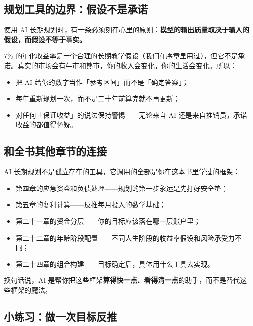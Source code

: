 \documentclass[a4paper,11pt,oneside,fontset=none,UTF8,zihao=-4]{ctexbook}
\providecommand{\tightlist}{\setlength{\itemsep}{2pt}\setlength{\parskip}{1pt}}
\begin{document}
\subsection{规划工具的边界：假设不是承诺}\label{ux89c4ux5212ux5de5ux5177ux7684ux8fb9ux754cux5047ux8bbeux4e0dux662fux627fux8bfa}

使用 AI
长期规划时，有一条必须刻在心里的原则：\textbf{模型的输出质量取决于输入的假设，而假设不等于事实。}

7\%
的年化收益率是一个合理的长期教学假设（我们在序章里用过），但它不是承诺。真实的市场会有牛市和熊市，你的收入会变化，你的生活会变化。所以：

\begin{itemize}
\tightlist
\item
  把 AI 给你的数字当作「参考区间」而不是「确定答案」；
\item
  每年重新规划一次，而不是二十年前算完就不再更新；
\item
  对任何「保证收益」的说法保持警惕------无论来自 AI
  还是来自推销员，承诺收益的都值得怀疑。
\end{itemize}

\subsection{和全书其他章节的连接}\label{ux548cux5168ux4e66ux5176ux4ed6ux7ae0ux8282ux7684ux8fdeux63a5}

AI 长期规划不是孤立存在的工具，它调用的全部是你在这本书里学过的框架：

\begin{itemize}
\tightlist
\item
  第四章的应急资金和负债处理------规划的第一步永远是先打好安全垫；
\item
  第五章的复利计算------反推每月投入的数学基础；
\item
  第二十一章的资金分层------你的目标应该落在哪一层账户里；
\item
  第二十二章的年龄阶段配置------不同人生阶段的收益率假设和风险承受力不同；
\item
  第二十四章的组合构建------目标确定后，具体用什么工具去实现。
\end{itemize}

换句话说，AI
是帮你把这些框架\textbf{算得快一点、看得清一点}的助手，而不是替代这些框架的魔法。

\subsection{小练习：做一次目标反推}\label{ux5c0fux7ec3ux4e60ux505aux4e00ux6b21ux76eeux6807ux53cdux63a8}
\end{document}
